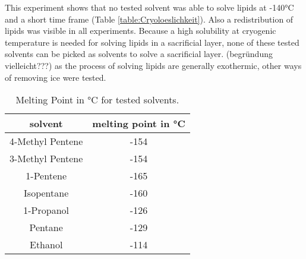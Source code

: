 This experiment shows that no tested solvent was able to solve lipids at -140°C and a short time frame (Table \ref{table:Cryoloeslichkeit}). Also a redistribution of lipids was visible in all experiments. Because a high solubility at cryogenic temperature is needed for solving lipids in a sacrificial layer, none of these tested solvents can be picked as solvents to solve a sacrificial layer. (begründung vielleicht???) as the process of solving lipids are generally exothermic, other ways of removing ice were tested.

\begin{table}[h]
	\centering
	\begin{tabular}{|c|c|}
		\hline
		solvent & melting point in °C \\
		\hline
		\hline
		4-Methyl Pentene & -154 \\ 
		\hline
		3-Methyl Pentene & -154 \\
		\hline
		1-Pentene & -165 \\
		\hline
		Isopentane & -160 \\
		\hline
		1-Propanol & -126 \\
		\hline
		Pentane & -129 \\
		\hline
		Ethanol & -114 \\
		\hline
	\end{tabular}
	\caption{Melting Point in °C for tested solvents.}
	\label{table:SchmelztemperaturLösungsmittel}
\end{table}


